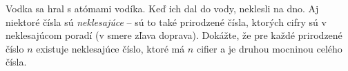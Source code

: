 \createTaskHeader[][9][]
Vodka sa hral s atómami vodíka. Keď ich dal do vody, neklesli na dno. Aj niektoré čísla sú \emph{neklesajúce} -- sú to také 
prirodzené čísla, ktorých cifry sú v neklesajúcom poradí (v smere zľava doprava).
Dokážte, že pre každé prirodzené číslo $n$ existuje neklesajúce číslo, ktoré má $n$ cifier a je druhou mocninou celého čísla.
